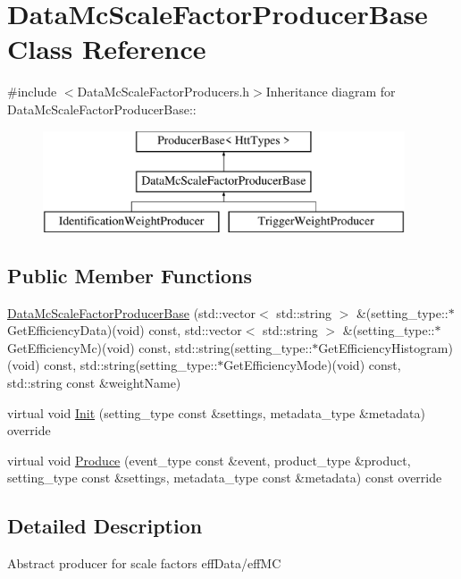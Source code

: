 \hypertarget{classDataMcScaleFactorProducerBase}{
\section{DataMcScaleFactorProducerBase Class Reference}
\label{classDataMcScaleFactorProducerBase}
}


{\ttfamily \#include $<$DataMcScaleFactorProducers.h$>$}Inheritance diagram for DataMcScaleFactorProducerBase::\begin{figure}[H]
\begin{center}
\leavevmode
\includegraphics[height=3cm]{classDataMcScaleFactorProducerBase}
\end{center}
\end{figure}
\subsection*{Public Member Functions}
\begin{DoxyCompactItemize}
\item 
\hyperlink{classDataMcScaleFactorProducerBase_a65cea4e8f17fb545c66bd905c1816494}{DataMcScaleFactorProducerBase} (std::vector$<$ std::string $>$ \&(setting\_\-type::$\ast$GetEfficiencyData)(void) const, std::vector$<$ std::string $>$ \&(setting\_\-type::$\ast$GetEfficiencyMc)(void) const, std::string(setting\_\-type::$\ast$GetEfficiencyHistogram)(void) const, std::string(setting\_\-type::$\ast$GetEfficiencyMode)(void) const, std::string const \&weightName)
\item 
virtual void \hyperlink{classDataMcScaleFactorProducerBase_a090986ea42a1af65a24615fb67dcc0d1}{Init} (setting\_\-type const \&settings, metadata\_\-type \&metadata) override
\item 
virtual void \hyperlink{classDataMcScaleFactorProducerBase_a314d652b207ce5bd9b33472b2ee41429}{Produce} (event\_\-type const \&event, product\_\-type \&product, setting\_\-type const \&settings, metadata\_\-type const \&metadata) const override
\end{DoxyCompactItemize}


\subsection{Detailed Description}
Abstract producer for scale factors effData/effMC 

